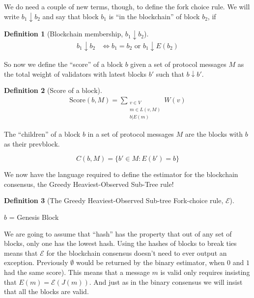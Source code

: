 \documentclass{article}
\theoremstyle{definition}
\newtheorem{defn}{Definition}[section]
\begin{document}
We do need a couple of new terms, though, to define the fork choice rule. We will write $b_1 \downarrow b_2$ and say that block $b_1$ is ``in the blockchain'' of block $b_2$, if 

\begin{defn}[Blockchain membership, $b_1 \downarrow b_2$]
\begin{align}
  b_1 \downarrow b_2 &\iff b_1 = b_2 \text{ or } b_1 \downarrow E(b_2) 
\end{align}
\end{defn}

So now we define the ``score'' of a block $b$ given a set of protocol messages $M$ as the total weight of validators with latest blocks $b'$ such that $b \downarrow b'$.

\begin{defn}[Score of a block]
\begin{align}
\text{Score}(b, M) = \sum_{\substack{v \in V \\ m \in L(v,M) \\ b|E(m)}} W(v)
\end{align}
\end{defn}

The ``children'' of a block $b$ in a set of protocol messages $M$ are the blocks with $b$ as their prevblock.

$$
C(b,M) = \{b' \in M : E(b') = b\}
$$

We now have the language required to define the estimator for the blockchain consensus, the Greedy Heaviest-Observed Sub-Tree rule!
\begin{defn}[The Greedy Heaviest-Observed Sub-tree Fork-choice rule, $\mathcal{E}$]
\end{defn}

\begin{algorithm}[H]
 $b$ = Genesis Block


\caption{The Greedy Heaviest-Observed Sub-tree Fork-choice rule, $\mathcal{E}$}
\end{algorithm}

We are going to assume that ``hash'' has the property that out of any set of blocks, only one has the lowest hash. Using the hashes of blocks to break ties means that $\mathcal{E}$ for the blockchain consensus doesn't need to ever output an exception. Previously $\emptyset$ would be returned by the binary estimator, when $0$ and $1$ had the same score). This means that a message $m$ is valid only requires insisting that $E(m) = \mathcal{E}(J(m))$. And just as in the binary consensus we will insist that all the blocks are valid.
\end{document}
